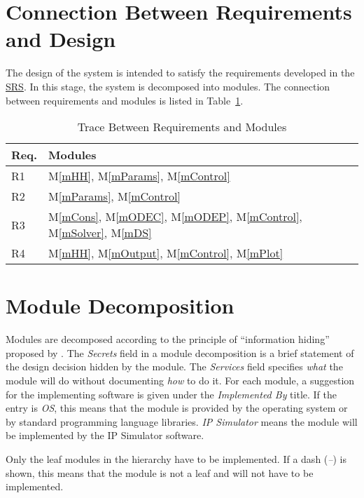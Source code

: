 \documentclass[12pt, titlepage]{article}
\newcommand{\mref}[1]{M\ref{#1}}
\begin{document}
\section{Connection Between Requirements and Design} \label{SecConnection}

The design of the system is intended to satisfy the requirements developed in the \href{https://github.com/MinMah23/CAS741-Project/tree/main/docs/SRS}{SRS}. In this stage, the system is decomposed into modules. The connection
between requirements and modules is listed in Table~\ref{TblRT}.
\begin{table}[H]
\centering
\begin{tabular}{p{} p{}}
\toprule
\textbf{Req.} & \textbf{Modules}\\
\midrule
R1 &  \mref{mHH}, \mref{mParams}, \mref{mControl}\\
R2 & \mref{mParams}, \mref{mControl}\\
R3 & \mref{mCons}, \mref{mODEC}, \mref{mODEP}, \mref{mControl}, \mref{mSolver}, \mref{mDS}\\
R4 & \mref{mHH}, \mref{mOutput}, \mref{mControl}, \mref{mPlot}\\

\bottomrule
\end{tabular}
\caption{Trace Between Requirements and Modules}
\label{TblRT}
\end{table}

\section{Module Decomposition} \label{SecMD}

Modules are decomposed according to the principle of ``information hiding''
proposed by \citet{ParnasEtAl1984}. The \emph{Secrets} field in a module
decomposition is a brief statement of the design decision hidden by the
module. The \emph{Services} field specifies \emph{what} the module will do
without documenting \emph{how} to do it. For each module, a suggestion for the implementing software is given under the \emph{Implemented By} title. If the entry is \emph{OS}, this means that the module is provided by the operating system or by standard programming language libraries.  \emph{IP Simulator} means the module will be implemented by the IP Simulator software.

Only the leaf modules in the hierarchy have to be implemented. If a dash
(\emph{--}) is shown, this means that the module is not a leaf and will not have to be implemented.
\end{document}
